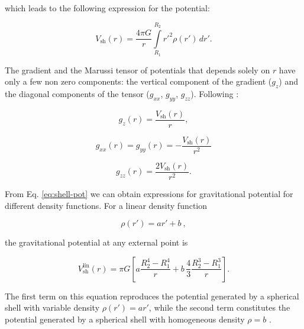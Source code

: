 \documentclass[extra]{gji}
\begin{document}
\noindent which leads to the following expression for the potential:

\begin{equation}
    V_\text{sh}(r) = \frac{4\pi G}{r}
    \int\limits_{R_1}^{R_2} {r'}^2 \rho(r') \, dr'.
\label{eq:shell-pot}
\end{equation}

The gradient and the Marussi tensor of potentials that
depends solely on $r$ have only a few non zero components: the vertical
component of the gradient ($g_z$) and the diagonal components of the
tensor ($g_{xx}$, $g_{yy}$, $g_{zz}$).
Following \citet{Grombein2013}:

\begin{equation}
    g_z(r) = \frac{V_\text{sh}(r)}{r},
\end{equation}

\begin{equation}
    g_{xx}(r) = g_{yy}(r) = -\frac{V_\text{sh}(r)}{r^2}
\end{equation}

\begin{equation}
    g_{zz}(r) = \frac{2V_\text{sh}(r)}{r^2}.
\end{equation}

From Eq. \ref{eq:shell-pot} we can obtain expressions for gravitational potential for
different density functions.
For a linear density function

\begin{equation}
    \rho(r') = ar' + b\ ,
\end{equation}

\noindent
the gravitational potential at any external point is

\begin{equation}
    V_\text{sh}^\text{lin}(r) = \pi G \left[
    a \frac{R_2^4 - R_1^4}{r} +
    b \,\frac{4}{3} \frac{R_2^3 - R_1^3}{r} \right].
    \label{eq:shell-pot-linear}
\end{equation}

\noindent The first term on this equation reproduces the potential generated
by a spherical shell with variable density $\rho(r') = ar'$, while the second
term constitutes the potential generated by a spherical shell with homogeneous
density $\rho = b$ \citep{Mikuska2006,Grombein2013}.
\end{document}
